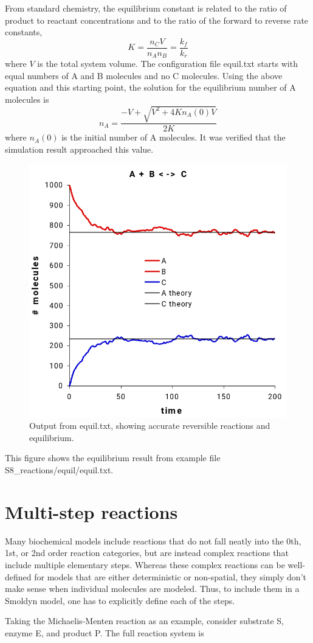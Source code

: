 \documentclass {scrbook}
\begin{document}
From standard chemistry, the equilibrium constant is related to the ratio of product to reactant concentrations and to the ratio of the forward to reverse rate constants,
$$K=\frac{n_C V}{n_A n_B} = \frac{k_f}{k_r}$$
where $V$ is the total system volume. The configuration file equil.txt starts with equal numbers of A and B molecules and no C molecules. Using the above equation and this starting point, the solution for the equilibrium number of A molecules is
$$n_A = \frac{-V + \sqrt{V^2+4Kn_A(0) V}}{2K}$$
where $n_A(0)$ is the initial number of A molecules. It was verified that the simulation result approached this value.

\begin{figure}[h]
\centering
\includegraphics[height=5 cm]{figures/image45.png}
\caption{Output from equil.txt, showing accurate reversible reactions and equilibrium.}
\label{fig:equil}
\end{figure}

This figure shows the equilibrium result from example file S8\_reactions/equil/equil.txt.

\section{Multi-step reactions}

Many biochemical models include reactions that do not fall neatly into the 0th, 1st, or 2nd order reaction categories, but are instead complex reactions that include multiple elementary steps. Whereas these complex reactions can be well-defined for models that are either deterministic or non-spatial, they simply don't make sense when individual molecules are modeled. Thus, to include them in a Smoldyn model, one has to explicitly define each of the steps.

Taking the Michaelis-Menten reaction as an example, consider substrate S, enzyme E, and product P. The full reaction system is
\end{document}
